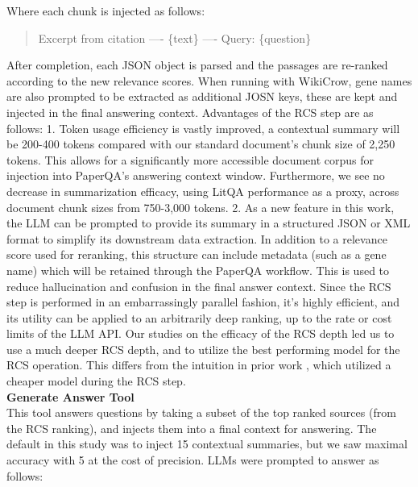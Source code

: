 Where each chunk is injected as follows:
\begin{quote}
    Excerpt from {citation}
    ----
    \{text\}
    ----
    Query: \{question\}
\end{quote}

After completion, each JSON object is parsed and the passages are re-ranked according to the new relevance scores. When running with WikiCrow, gene names are also prompted to be extracted as additional JOSN keys, these are kept and injected in the final answering context. Advantages of the RCS step are as follows: 1. Token usage efficiency is vastly improved, a contextual summary will be 200-400 tokens compared with our standard document's chunk size of 2,250 tokens. This allows for a significantly more accessible document corpus for injection into PaperQA's answering context window. Furthermore, we see no decrease in summarization efficacy, using LitQA performance as a proxy, across document chunk sizes from 750-3,000 tokens. 2. As a new feature in this work, the LLM can be prompted to provide its summary in a structured JSON or XML format to simplify its downstream data extraction. In addition to a relevance score used for reranking, this structure can include metadata (such as a gene name) which will be retained through the PaperQA workflow. This is used to reduce hallucination and confusion in the final answer context. Since the RCS step is performed in an embarrassingly parallel fashion, it's highly efficient, and its utility can be applied to an arbitrarily deep ranking, up to the rate or cost limits of the LLM API. Our studies on the efficacy of the RCS depth led us to use a much deeper RCS depth, and to utilize the best performing model for the RCS operation. This differs from the intuition in prior work \cite{lala2023paperqa}, which utilized a cheaper model during the RCS step. \\

\textbf{Generate Answer Tool} \\

This tool answers questions by taking a subset of the top ranked sources (from the RCS ranking), and injects them into a final context for answering. The default in this study was to inject 15 contextual summaries, but we saw maximal accuracy with 5 at the cost of precision. LLMs were prompted to answer as follows:

